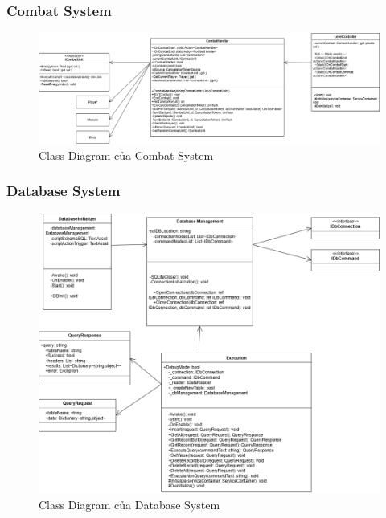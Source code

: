 \subsubsection{Combat System}
\begin{figure}[H]
	\centering
	\includegraphics[width=\textwidth]{Images/CD/CombatCD.drawio.png}
	\vspace{0.5cm}
	\caption{Class Diagram của Combat System}
\end{figure}
\subsubsection{Database System}
\begin{figure}[H]
	\centering
	\includegraphics[width=\textwidth]{Images/CD/DBCD.drawio.png}
	\vspace{0.5cm}
	\caption{Class Diagram của Database System}
\end{figure}
